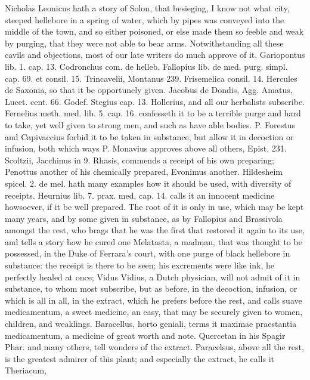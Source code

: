{Nicholas Leonicus hath a story of Solon, that
besieging, I know not what city, steeped hellebore in a spring of
water, which by pipes was conveyed into the middle of the town, and so
either poisoned, or else made them so feeble and weak by purging, that
they were not able to bear arms. Notwithstanding all these cavils and
objections, most of our late writers do much approve of it. 
Gariopontus lib. 1. cap. 13. Codronchus com. de helleb. Fallopius lib.
de med. purg. simpl. cap. 69. et consil. 15. Trincavelii, Montanus 239.
Frisemelica consil. 14. Hercules de Saxonia, so that it be opportunely
given. Jacobus de Dondis, Agg. Amatus, Lucet. cent. 66. Godef. Stegius
cap. 13. Hollerius, and all our herbalists subscribe. Fernelius meth.
med. lib. 5. cap. 16. confesseth it to be a  terrible purge and
hard to take, yet well given to strong men, and such as have able
bodies. P. Forestus and Capivaccius forbid it to be taken in substance,
but allow it in decoction or infusion, both which ways P. Monavius
approves above all others, Epist. 231. Scoltzii, Jacchinus in 9.
Rhasis, commends a receipt of his own preparing; Penottus another of
his chemically prepared, Evonimus another. Hildesheim spicel. 2. de
mel. hath many examples how it should be used, with diversity of
receipts. Heurnius lib. 7. prax. med. cap. 14. calls it an
innocent medicine howsoever, if it be well prepared. The root of
it is only in use, which may be kept many years, and by some given in
substance, as by Fallopius and Brassivola amongst the rest, who
brags that he was the first that restored it again to its use,
and tells a story how he cured one Melatasta, a madman, that was
thought to be possessed, in the Duke of Ferrara's court, with one purge
of black hellebore in substance: the receipt is there to be seen; his
excrements were like ink, he perfectly healed at once; Vidus
Vidius, a Dutch physician, will not admit of it in substance, to whom
most subscribe, but as before, in the decoction, infusion, or which is
all in all, in the extract, which he prefers before the rest, and calls
suave medicamentum, a sweet medicine, an easy, that may be securely
given to women, children, and weaklings. Baracellus, horto geniali,
terms it maximae praestantia medicamentum, a medicine of great worth
and note. Quercetan in his Spagir Phar. and many others, tell wonders
of the extract. Paracelsus, above all the rest, is the greatest admirer
of this plant; and especially the extract, he calls it Theriacum,
}
